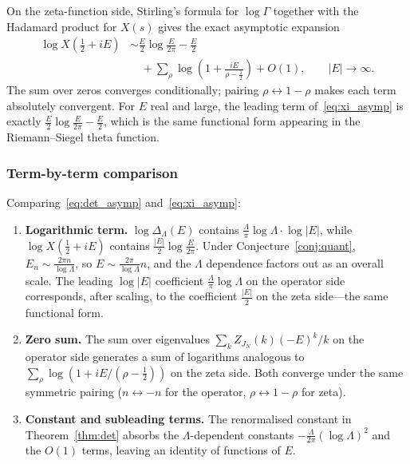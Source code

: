 \documentclass{pre-aomart}
\def\zeta{Z}%
\def\xi{X}%
\theoremstyle{plain}
\theoremstyle{definition}
\theoremstyle{remark}
\begin{document}
On the zeta-function side, Stirling's formula for $\log\Gamma$ together with
the Hadamard product for $\xi(s)$ gives the exact asymptotic expansion
\begin{align}
\log\xi(\tfrac{1}{2} + iE) &\sim
  \frac{E}{2}\log\frac{E}{2\pi} - \frac{E}{2} \nonumber\\
  &\quad + \sum_{\rho} \log\!\left(1 + \frac{iE}{\rho-\tfrac{1}{2}}\right)
  + O(1), \qquad |E| \to \infty. \label{eq:xi_asymp}
\end{align}
The sum over zeros converges conditionally; pairing $\rho \leftrightarrow 1-\rho$
makes each term absolutely convergent.  For $E$ real and large, the leading
term of~\eqref{eq:xi_asymp} is exactly $\frac{E}{2}\log\frac{E}{2\pi}
- \frac{E}{2}$, which is the same functional form appearing in the
Riemann--Siegel theta function.

\subsubsection{Term-by-term comparison}

Comparing~\eqref{eq:det_asymp} and~\eqref{eq:xi_asymp}:

\begin{enumerate}
\item \textbf{Logarithmic term.}
  $\log\Delta_\Lambda(E)$ contains $\frac{\Lambda}{\pi}\log\Lambda \cdot
  \log|E|$, while $\log\xi(\frac{1}{2} + iE)$ contains
  $\frac{|E|}{2}\log\frac{E}{2\pi}$.  Under Conjecture~\ref{conj:quant},
  $E_n \sim \frac{2\pi n}{\log\Lambda}$, so $E \sim \frac{2\pi}{\log\Lambda}
  n$, and the $\Lambda$ dependence factors out as an overall scale.  The
  leading $\log|E|$ coefficient $\frac{\Lambda}{\pi}\log\Lambda$ on the
  operator side corresponds, after scaling, to the coefficient
  $\frac{|E|}{2}$ on the zeta side---the same functional form.

\item \textbf{Zero sum.}
  The sum over eigenvalues $\sum_k \zeta_{J_N}(k)(-E)^k/k$ on the
  operator side generates a sum of logarithms analogous to
  $\sum_\rho \log(1 + iE/(\rho - \frac{1}{2}))$ on the zeta side.  Both
  converge under the same symmetric pairing ($n \leftrightarrow -n$ for
  the operator, $\rho \leftrightarrow 1-\rho$ for zeta).

\item \textbf{Constant and subleading terms.}
  The renormalised constant in Theorem~\ref{thm:det} absorbs the
  $\Lambda$-dependent constants $-\frac{\Lambda}{2\pi}(\log\Lambda)^2$
  and the $O(1)$ terms, leaving an identity of functions of $E$.
\end{enumerate}
\end{document}
